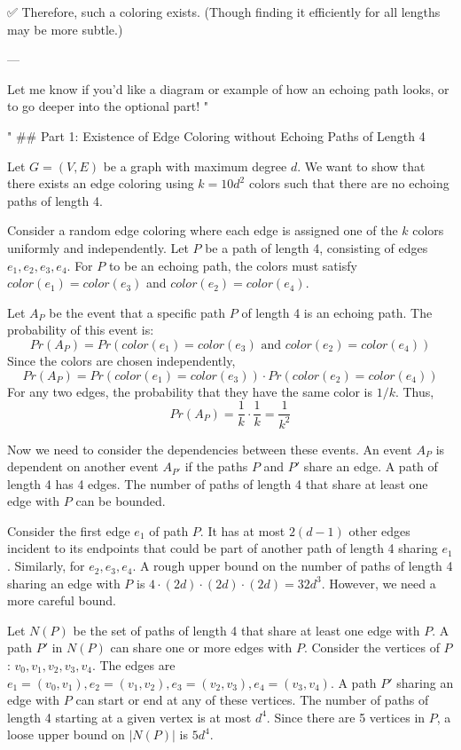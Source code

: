 \begin{enumerate}
\begin{shaded}
✅ Therefore, such a coloring exists. (Though finding it efficiently for all lengths may be more subtle.)

---

Let me know if you'd like a diagram or example of how an echoing path looks, or to go deeper into the optional part!
"

"
## Part 1: Existence of Edge Coloring without Echoing Paths of Length 4

Let $G = (V, E)$ be a graph with maximum degree $d$. We want to show that there exists an edge coloring using $k = 10d^2$ colors such that there are no echoing paths of length 4.

Consider a random edge coloring where each edge is assigned one of the $k$ colors uniformly and independently. Let $P$ be a path of length 4, consisting of edges $e_1, e_2, e_3, e_4$. For $P$ to be an echoing path, the colors must satisfy $color(e_1) = color(e_3)$ and $color(e_2) = color(e_4)$.

Let $A_P$ be the event that a specific path $P$ of length 4 is an echoing path. The probability of this event is:
$$Pr(A_P) = Pr(color(e_1) = color(e_3) \text{ and } color(e_2) = color(e_4))$$
Since the colors are chosen independently,
$$Pr(A_P) = Pr(color(e_1) = color(e_3)) \cdot Pr(color(e_2) = color(e_4))$$
For any two edges, the probability that they have the same color is $1/k$. Thus,
$$Pr(A_P) = \frac{1}{k} \cdot \frac{1}{k} = \frac{1}{k^2}$$

Now we need to consider the dependencies between these events. An event $A_P$ is dependent on another event $A_{P'}$ if the paths $P$ and $P'$ share an edge. A path of length 4 has 4 edges. The number of paths of length 4 that share at least one edge with $P$ can be bounded.

Consider the first edge $e_1$ of path $P$. It has at most $2(d-1)$ other edges incident to its endpoints that could be part of another path of length 4 sharing $e_1$. Similarly, for $e_2, e_3, e_4$. A rough upper bound on the number of paths of length 4 sharing an edge with $P$ is $4 \cdot (2d) \cdot (2d) \cdot (2d) = 32d^3$. However, we need a more careful bound.

Let $N(P)$ be the set of paths of length 4 that share at least one edge with $P$. A path $P'$ in $N(P)$ can share one or more edges with $P$.  Consider the vertices of $P$: $v_0, v_1, v_2, v_3, v_4$. The edges are $e_1 = (v_0, v_1), e_2 = (v_1, v_2), e_3 = (v_2, v_3), e_4 = (v_3, v_4)$. A path $P'$ sharing an edge with $P$ can start or end at any of these vertices. The number of paths of length 4 starting at a given vertex is at most $d^4$. Since there are 5 vertices in $P$, a loose upper bound on $|N(P)|$ is $5 d^4$.


\end{shaded}
\end{enumerate}
